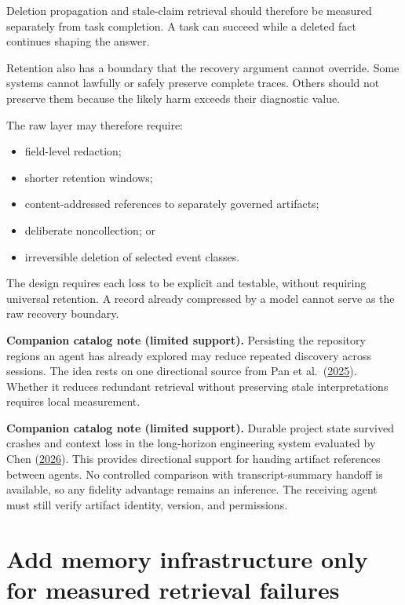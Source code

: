 Deletion propagation and stale-claim retrieval should therefore be measured separately from task completion. A task can succeed while a deleted fact continues shaping the answer.

Retention also has a boundary that the recovery argument cannot override. Some systems cannot lawfully or safely preserve complete traces. Others should not preserve them because the likely harm exceeds their diagnostic value.


The raw layer may therefore require:

\begin{itemize}
\tightlist
\item
  field-level redaction;
\item
  shorter retention windows;
\item
  content-addressed references to separately governed artifacts;
\item
  deliberate noncollection; or
\item
  irreversible deletion of selected event classes.
\end{itemize}

The design requires each loss to be explicit and testable, without requiring universal retention. A record already compressed by a model cannot serve as the raw recovery boundary.

\textbf{Companion catalog note (limited support).} Persisting the repository regions an agent has already explored may reduce repeated discovery across sessions. The idea rests on one directional source from Pan et al.~(\href{https://arxiv.org/abs/2507.19942}{2025}). Whether it reduces redundant retrieval without preserving stale interpretations requires local measurement.

\textbf{Companion catalog note (limited support).} Durable project state survived crashes and context loss in the long-horizon engineering system evaluated by Chen (\href{https://arxiv.org/abs/2604.13018}{2026}). This provides directional support for handing artifact references between agents. No controlled comparison with transcript-summary handoff is available, so any fidelity advantage remains an inference. The receiving agent must still verify artifact identity, version, and permissions.

\hypertarget{add-memory-infrastructure-only-for-measured-retrieval-failures}{%
\section{Add memory infrastructure only for measured retrieval failures}\label{add-memory-infrastructure-only-for-measured-retrieval-failures}}

